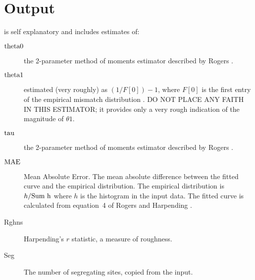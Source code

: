 \section{Output} is self explanatory and includes estimates of:
\begin{description}
\item[$\hbox{theta0}$]the 2-parameter method of moments estimator described by
          Rogers \cite{Rogers:E-49-608}.
\item[$\hbox{theta1}$]estimated (very roughly) as $(1/F[0]) - 1$, where
      $F[0]$ is the first entry of the empirical mismatch distribution
      \cite{Rogers:MBE-9-552}. DO NOT PLACE ANY FAITH IN THIS
          ESTIMATOR; it provides only a very rough indication of the 
          magnitude of $\theta1$.  
\item[$\hbox{tau}$]the 2-parameter method of moments estimator described by
          Rogers \cite{Rogers:E-49-608}.
\item[$\hbox{MAE}$] Mean Absolute Error.  The mean absolute difference
      between the fitted curve and the empirical distribution.  The
          empirical distribution is $h/\hbox{Sum h}$ where $h$ is the histogram
          in the input data.  The fitted curve is calculated from
          equation~4 of Rogers and Harpending \cite{Rogers:MBE-9-552}. 
\item[Rghns]Harpending's \cite{Harpending:HB-66-591} $r$ statistic, a
measure of roughness.
\item[Seg]The number of segregating sites, copied from the input.
\end{description}
